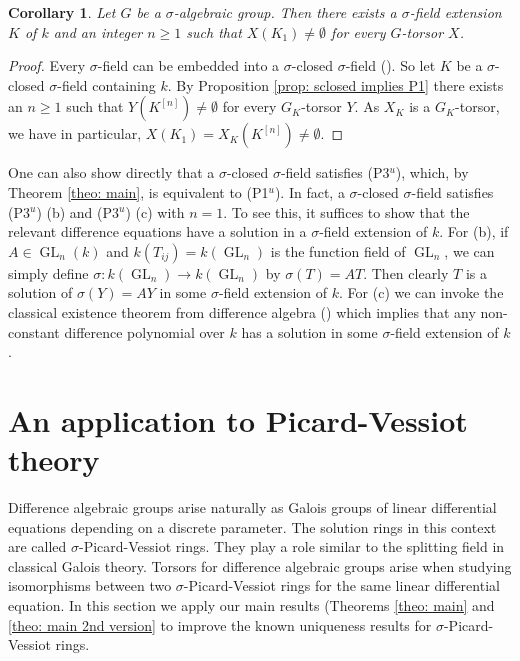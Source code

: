 \documentclass[oneside,reqno]{amsart}
\newtheorem{cor}[theo]{Corollary}
\theoremstyle{definition}
\newcommand{\Gl}{\operatorname{GL}}
\newcommand{\s}{\sigma}
\newcommand{\po}{{\rm{(P1$^u$)}}}
\newcommand{\pt}{{\rm{(P3$^u$)}}}
\begin{document}
\begin{cor}
	Let $G$ be a $\s$-algebraic group. Then there exists a $\s$-field extension $K$ of $k$ and an integer $n\geq 1$ such that  $X(K_1)\neq\emptyset$ for every $G$-torsor $X$. 
\end{cor}	
\begin{proof}
	Every $\s$-field can be embedded into a $\s$-closed $\s$-field (\cite[Theorem 1.1]{ChatzidakisHrushovski:ModelTheoryOfDifferenceFields}). So let $K$ be a $\s$-closed $\s$-field containing $k$. By Proposition \ref{prop: sclosed implies P1} there exists an $n\geq 1$ such that $Y(K^{[n]})\neq\emptyset$ for every $G_K$-torsor $Y$. As $X_K$ is a $G_K$-torsor, we have in particular, $X(K_1)=X_K(K^{[n]})\neq\emptyset$.
\end{proof}	


One can also show directly that a $\s$-closed $\s$-field satisfies \pt{}, which, by Theorem \ref{theo: main}, is equivalent to \po{}. In fact, a $\s$-closed $\s$-field satisfies
 \pt{} (b) and \pt{} (c) with $n=1$. To see this, it suffices to show that the relevant difference equations have a solution in a $\s$-field extension of $k$. For (b), if $A\in\Gl_n(k)$ and $k(T_{ij})=k(\Gl_n)$ is the function field of $\Gl_n$, we can simply define $\s\colon k(\Gl_n)\to k(\Gl_n)$ by $\s(T)=AT$. Then clearly $T$ is a solution of $\s(Y)=AY$ in some $\s$-field extension of $k$. For (c) we can invoke the classical existence theorem from difference algebra (\cite[Theorem 7.2.1]{Levin:difference}) which implies that any non-constant difference polynomial over $k$ has a solution in some $\s$-field extension of $k$. 

\section{An application to Picard-Vessiot theory}
\label{sec: Applicationt to PV}


Difference algebraic groups arise naturally as Galois groups 
of linear differential equations depending on a discrete parameter. The solution rings in this context are called $\s$-Picard-Vessiot rings. They play a role similar to the splitting field in classical Galois theory. Torsors for difference algebraic groups arise when studying isomorphisms between two $\s$-Picard-Vessiot rings for the same linear differential equation. In this section we apply our main results (Theorems \ref{theo: main} and \ref{theo: main 2nd version} to improve the known uniqueness results for $\s$-Picard-Vessiot rings.
\end{document}
